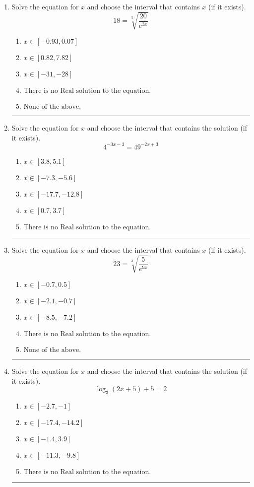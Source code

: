 \documentclass[14pt]{extbook}
\newcommand{\litem}[1]{\item#1\hspace*{-1cm}\rule{\textwidth}{0.4pt}}
\begin{document}
\begin{enumerate}
{\begin{enumerate}[label=\Alph*.]
\end{enumerate} }
\litem{
 Solve the equation for $x$ and choose the interval that contains $x$ (if it exists).\[  18 = \sqrt[5]{\frac{20}{e^{3x}}} \]\begin{enumerate}[label=\Alph*.]
\item \( x \in [-0.93, 0.07] \)
\item \( x \in [0.82, 7.82] \)
\item \( x \in [-31, -28] \)
\item \( \text{There is no Real solution to the equation.} \)
\item \( \text{None of the above.} \)

\end{enumerate} }
\litem{
Solve the equation for $x$ and choose the interval that contains the solution (if it exists).\[ 4^{-3x-3} = 49^{-2x+3} \]\begin{enumerate}[label=\Alph*.]
\item \( x \in [3.8, 5.1] \)
\item \( x \in [-7.3, -5.6] \)
\item \( x \in [-17.7, -12.8] \)
\item \( x \in [0.7, 3.7] \)
\item \( \text{There is no Real solution to the equation.} \)

\end{enumerate} }
\litem{
 Solve the equation for $x$ and choose the interval that contains $x$ (if it exists).\[  23 = \sqrt[3]{\frac{5}{e^{9x}}} \]\begin{enumerate}[label=\Alph*.]
\item \( x \in [-0.7, 0.5] \)
\item \( x \in [-2.1, -0.7] \)
\item \( x \in [-8.5, -7.2] \)
\item \( \text{There is no Real solution to the equation.} \)
\item \( \text{None of the above.} \)

\end{enumerate} }
\litem{
Solve the equation for $x$ and choose the interval that contains the solution (if it exists).\[ \log_{3}{(2x+5)}+5 = 2 \]\begin{enumerate}[label=\Alph*.]
\item \( x \in [-2.7, -1] \)
\item \( x \in [-17.4, -14.2] \)
\item \( x \in [-1.4, 3.9] \)
\item \( x \in [-11.3, -9.8] \)
\item \( \text{There is no Real solution to the equation.} \)


\end{enumerate}}
\end{enumerate}
\end{document}
